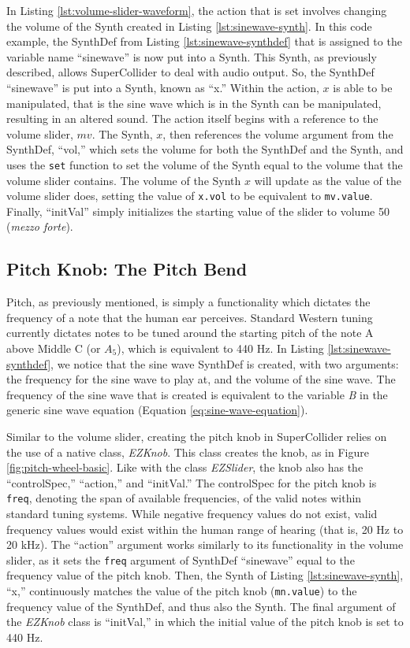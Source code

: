 In Listing \ref{lst:volume-slider-waveform}, the action that is set involves changing the volume of the Synth created in Listing \ref{lst:sinewave-synth}. In this code example, the SynthDef from Listing \ref{lst:sinewave-synthdef} that is assigned to the variable name ``sinewave'' is now put into a Synth. This Synth, as previously described, allows SuperCollider to deal with audio output. So, the SynthDef ``sinewave'' is put into a Synth, known as ``x.'' Within the action, $x$ is able to be manipulated, that is the sine wave which is in the Synth can be manipulated, resulting in an altered sound. The action itself begins with a reference to the volume slider, $mv$. The Synth, $x$, then references the volume argument from the SynthDef, ``vol,'' which sets the volume for both the SynthDef and the Synth, and uses the \texttt{set} function to set the volume of the Synth equal to the volume that the volume slider contains. The volume of the Synth $x$ will update as the value of the volume slider does, setting the value of \texttt{x.vol} to be equivalent to \texttt{mv.value}. Finally, ``initVal'' simply initializes the starting value of the slider to volume 50 (\textit{mezzo forte}).

\subsection{Pitch Knob: The Pitch Bend}

Pitch, as previously mentioned, is simply a functionality which dictates the frequency of a note that the human ear perceives. Standard Western tuning currently dictates notes to be tuned around the starting pitch of the note A above Middle C (or $A_5$), which is equivalent to 440 Hz. In Listing \ref{lst:sinewave-synthdef}, we notice that the sine wave SynthDef is created, with two arguments: the frequency for the sine wave to play at, and the volume of the sine wave. The frequency of the sine wave that is created is equivalent to the variable \textit{B} in the generic sine wave equation (Equation \ref{eq:sine-wave-equation}).

Similar to the volume slider, creating the pitch knob in SuperCollider relies on the use of a native class, \textit{EZKnob}. This class creates the knob, as in Figure \ref{fig:pitch-wheel-basic}. Like with the class \textit{EZSlider}, the knob also has the ``controlSpec,'' ``action,'' and ``initVal.'' The controlSpec for the pitch knob is \texttt{freq}, denoting the span of available frequencies, of the valid notes within standard tuning systems. While negative frequency values do not exist, valid frequency values would exist within the human range of hearing (that is, 20 Hz to 20 kHz). The ``action'' argument works similarly to its functionality in the volume slider, as it sets the \texttt{freq} argument of SynthDef ``sinewave'' equal to the frequency value of the pitch knob. Then, the Synth of Listing \ref{lst:sinewave-synth}, ``x,'' continuously matches the value of the pitch knob (\texttt{mn.value}) to the frequency value of the SynthDef, and thus also the Synth. The final argument of the \textit{EZKnob} class is ``initVal,'' in which the initial value of the pitch knob is set to 440 Hz.


